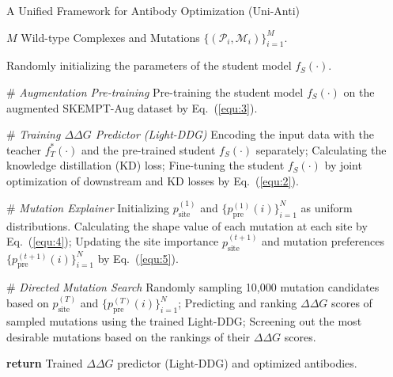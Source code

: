\begin{algorithm}[!htbp]
	\caption{A Unified Framework for Antibody Optimization (Uni-Anti)}
	\label{algo:1}
	\begin{algorithmic}[1]
		\Require $M$ Wild-type Complexes and Mutations $\{(\mathcal{P}_i,\mathcal{M}_i)\}_{i=1}^M$.
		
	   \State Randomly initializing the parameters of the student model $f_S(\cdot)$.

            \State \# \textit{Augmentation Pre-training}
            \State Pre-training the student model $f_S(\cdot)$ on the augmented SKEMPT-Aug dataset by Eq.~(\ref{equ:3}).
            \newline 
            
            \State \# \textit{Training $\Delta\Delta G$ Predictor (Light-DDG)}
            \State Encoding the input data with the teacher $f^*_T(\cdot)$ and the pre-trained student $f_S(\cdot)$ separately;
            \State Calculating the knowledge distillation (KD) loss;
            \State Fine-tuning the student $f_S(\cdot)$ by joint optimization of downstream and KD losses by Eq.~(\ref{equ:2}).
            \newline
            
            \State \# \textit{Mutation Explainer}
            \State Initializing $p_{\text{site}}^{(1)}$ and $\{p_{\text{pre}}^{(1)}(i)\}_{i=1}^N$ as uniform distributions.
		  \State Calculating the shape value of each mutation at each site by Eq.~(\ref{equ:4});
            \State Updating the site importance $p_{\text{site}}^{(t+1)}$ and mutation preferences $\{p_{\text{pre}}^{(t+1)}(i)\}_{i=1}^N$ by Eq.~(\ref{equ:5}).
		\EndFor
            \newline 
            
            \State \# \textit{Directed Mutation Search}
		\State Randomly sampling 10,000 mutation candidates based on $p_{\text{site}}^{(T)}$ and $\{p_{\text{pre}}^{(T)}(i)\}_{i=1}^N$;
            \State Predicting and ranking $\Delta\Delta G$ scores of sampled mutations using the trained Light-DDG;
            \State Screening out the most desirable mutations based on the rankings of their $\Delta\Delta G$ scores.
            \newline 
            
            \State \textbf{return} Trained $\Delta\Delta G$ predictor (Light-DDG) and optimized antibodies.
	\end{algorithmic}
\end{algorithm}


